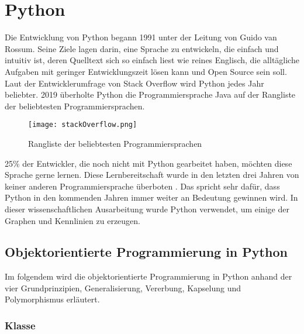 
\chapter{Python}

Die Entwicklung von Python begann 1991 unter der Leitung von Guido van Rossum. Seine Ziele lagen darin, eine Sprache zu entwickeln, die einfach und intuitiv ist, deren Quelltext sich so einfach liest wie reines Englisch, die alltägliche Aufgaben mit geringer Entwicklungszeit lösen kann und Open Source sein soll.
Laut der Entwicklerumfrage von Stack Overflow wird Python jedes Jahr beliebter. 2019 überholte Python die Programmiersprache Java auf der Rangliste der beliebtesten Programmiersprachen. 

\begin{figure}[!htb]
\texttt{[image: stackOverflow.png]}%
\caption{Rangliste der beliebtesten Programmiersprachen }
\label{img:stackoverflowBild}
\end{figure}

25\% der Entwickler, die noch nicht mit Python gearbeitet haben, möchten diese Sprache gerne lernen. Diese Lernbereitschaft wurde in den letzten drei Jahren von keiner anderen Programmiersprache überboten \cite{stackoverflow}. Das spricht sehr dafür, dass Python in den kommenden Jahren immer weiter an Bedeutung gewinnen wird. In dieser wissenschaftlichen Ausarbeitung wurde Python verwendet, um einige der Graphen und Kennlinien zu erzeugen. 

\section{Objektorientierte Programmierung in Python}

Im folgendem wird die objektorientierte Programmierung in Python anhand der vier Grundprinzipien, Generalisierung, Vererbung, Kapselung und Polymorphismus erläutert. 

\subsection{Klasse} \label{subsec:Klasse}

